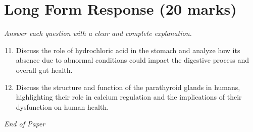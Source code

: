 \documentclass[12pt]{article}
\begin{document}
\section*{Long Form Response (20 marks)}
\textit{Answer each question with a clear and complete explanation.}
\begin{enumerate}[label=\arabic*.]
\setcounter{enumi}{10}
\item Discuss the role of hydrochloric acid in the stomach and analyze how its absence due to abnormal conditions could impact the digestive process and overall gut health.
\item Discuss the structure and function of the parathyroid glands in humans, highlighting their role in calcium regulation and the implications of their dysfunction on human health.
\end{enumerate}

\vfill
\noindent\textit{End of Paper}
\end{document}
